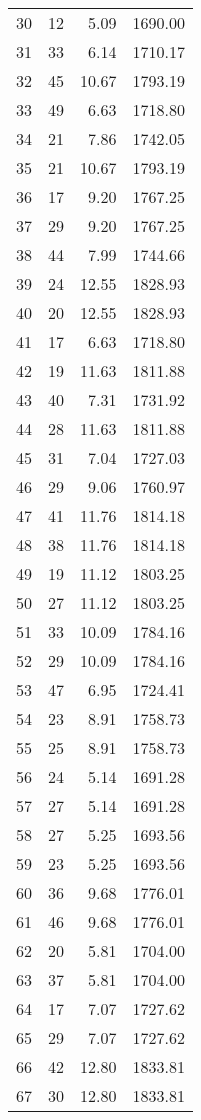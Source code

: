 \begin{appendix}
\begin{longtable}{rrrr}
30 & 12 & 5.09 & 1690.00 \\
31 & 33 & 6.14 & 1710.17 \\
32 & 45 & 10.67 & 1793.19 \\
33 & 49 & 6.63 & 1718.80 \\
34 & 21 & 7.86 & 1742.05 \\
35 & 21 & 10.67 & 1793.19 \\
36 & 17 & 9.20 & 1767.25 \\
37 & 29 & 9.20 & 1767.25 \\
38 & 44 & 7.99 & 1744.66 \\
39 & 24 & 12.55 & 1828.93 \\
40 & 20 & 12.55 & 1828.93 \\
41 & 17 & 6.63 & 1718.80 \\
42 & 19 & 11.63 & 1811.88 \\
43 & 40 & 7.31 & 1731.92 \\
44 & 28 & 11.63 & 1811.88 \\
45 & 31 & 7.04 & 1727.03 \\
46 & 29 & 9.06 & 1760.97 \\
47 & 41 & 11.76 & 1814.18 \\
48 & 38 & 11.76 & 1814.18 \\
49 & 19 & 11.12 & 1803.25 \\
50 & 27 & 11.12 & 1803.25 \\
51 & 33 & 10.09 & 1784.16 \\
52 & 29 & 10.09 & 1784.16 \\
53 & 47 & 6.95 & 1724.41 \\
54 & 23 & 8.91 & 1758.73 \\
55 & 25 & 8.91 & 1758.73 \\
56 & 24 & 5.14 & 1691.28 \\
57 & 27 & 5.14 & 1691.28 \\
58 & 27 & 5.25 & 1693.56 \\
59 & 23 & 5.25 & 1693.56 \\
60 & 36 & 9.68 & 1776.01 \\
61 & 46 & 9.68 & 1776.01 \\
62 & 20 & 5.81 & 1704.00 \\
63 & 37 & 5.81 & 1704.00 \\
64 & 17 & 7.07 & 1727.62 \\
65 & 29 & 7.07 & 1727.62 \\
66 & 42 & 12.80 & 1833.81 \\
67 & 30 & 12.80 & 1833.81 \\
\bottomrule
\end{longtable}


\end{appendix}
